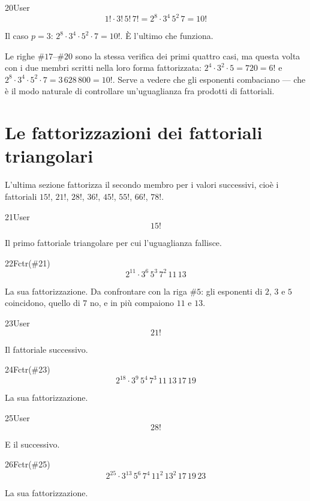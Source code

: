 \begin{espr}{20}{User}{\verificata}
\[
1! \cdot 3!\, 5!\, 7! = 2^{8} \cdot 3^{4}\, 5^{2}\, 7 = 10!
\]
\end{espr}
Il caso $p=3$: $2^8\cdot3^4\cdot5^2\cdot7=10!$. È l'ultimo che funziona.


Le righe $\#17$--$\#20$ sono la stessa verifica dei primi quattro casi, ma questa volta con i due membri scritti nella loro forma fattorizzata: $2^4\cdot3^2\cdot5=720=6!$ e $2^8\cdot3^4\cdot5^2\cdot7=3\,628\,800=10!$. Serve a vedere che gli esponenti combaciano — che è il modo naturale di controllare un'uguaglianza fra prodotti di fattoriali.

\section{Le fattorizzazioni dei fattoriali triangolari}

L'ultima sezione fattorizza il secondo membro per i valori successivi, cioè i fattoriali $15!$, $21!$, $28!$, $36!$, $45!$, $55!$, $66!$, $78!$.

\begin{espr}{21}{User}{}
\[
15!
\]
\end{espr}
Il primo fattoriale triangolare per cui l'uguaglianza fallisce.

\begin{espr}{22}{Fctr(\#21)}{}
\[
2^{11} \cdot 3^{6}\, 5^{3}\, 7^{2}\, 11\, 13
\]
\end{espr}
La sua fattorizzazione. Da confrontare con la riga $\#5$: gli esponenti di $2$, $3$ e $5$ coincidono, quello di $7$ no, e in più compaiono $11$ e $13$.

\begin{espr}{23}{User}{}
\[
21!
\]
\end{espr}
Il fattoriale successivo.

\begin{espr}{24}{Fctr(\#23)}{}
\[
2^{18} \cdot 3^{9}\, 5^{4}\, 7^{3}\, 11\, 13\, 17\, 19
\]
\end{espr}
La sua fattorizzazione.

\begin{espr}{25}{User}{}
\[
28!
\]
\end{espr}
E il successivo.

\begin{espr}{26}{Fctr(\#25)}{}
\[
2^{25} \cdot 3^{13}\, 5^{6}\, 7^{4}\, 11^{2}\, 13^{2}\, 17\, 19\, 23
\]
\end{espr}
La sua fattorizzazione.

